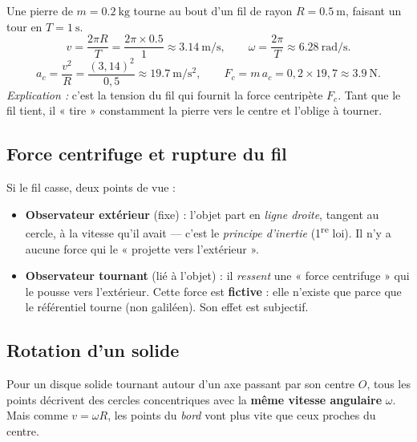 \documentclass[11pt,a4paper]{article}
\begin{document}
\begin{exemple}
Une pierre de $m=\qty{0,2}{\kilogram}$ tourne au bout d'un fil de rayon $R=\qty{0,5}{\metre}$,
faisant un tour en $T=\qty{1}{\second}$.
\[ v=\frac{2\pi R}{T}=\frac{2\pi\times\num{0,5}}{1}\approx\qty{3,14}{\metre\per\second},\qquad
   \omega=\frac{2\pi}{T}\approx\qty{6,28}{\radian\per\second}. \]
\[ a_c=\frac{v^2}{R}=\frac{(3,14)^2}{0,5}\approx\qty{19,7}{\metre\per\second\squared},\qquad
   F_c=m\,a_c=0,2\times19,7\approx\qty{3,9}{\newton}. \]
\emph{Explication :} c'est la tension du fil qui fournit la force centripète $F_c$. Tant que le fil
tient, il « tire » constamment la pierre vers le centre et l'oblige à tourner.
\end{exemple}

\subsection{Force centrifuge et rupture du fil}

\begin{remarque}
Si le fil casse, deux points de vue :
\begin{itemize}[leftmargin=1.6em,topsep=2pt,itemsep=1.5pt]
  \item \textbf{Observateur extérieur} (fixe) : l'objet part en \emph{ligne droite}, tangent au cercle, à la vitesse qu'il avait — c'est le \emph{principe d'inertie} (1\textsuperscript{re} loi). Il n'y a aucune force qui le « projette vers l'extérieur ».
  \item \textbf{Observateur tournant} (lié à l'objet) : il \emph{ressent} une « force centrifuge » qui le pousse vers l'extérieur. Cette force est \textbf{fictive} : elle n'existe que parce que le référentiel tourne (non galiléen). Son effet est subjectif.
\end{itemize}
\end{remarque}

\subsection{Rotation d'un solide}

\begin{definition}
Pour un disque solide tournant autour d'un axe passant par son centre $O$, tous les points décrivent
des cercles concentriques avec la \textbf{même vitesse angulaire} $\omega$. Mais comme $v=\omega R$,
les points du \emph{bord} vont plus vite que ceux proches du centre.
\end{definition}
\end{document}
